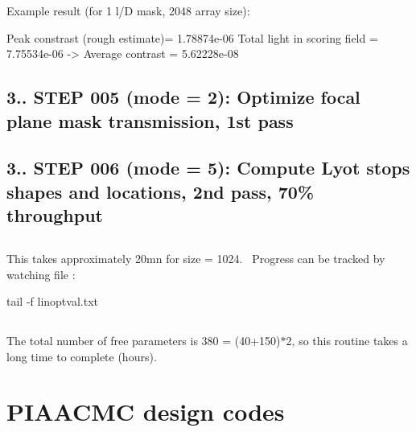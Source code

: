Example result (for 1 l/\+D mask, 2048 array size)\+: \begin{DoxyVerb}Peak constrast (rough estimate)= 1.78874e-06
Total light in scoring field = 7.75534e-06  -> Average contrast = 5.62228e-08
\end{DoxyVerb}
\hypertarget{md_src_PIAACMCsimul_README_step005}{}\subsection{3.. S\+T\+E\+P 005 (mode = 2)\+: Optimize focal plane mask transmission, 1st pass}\label{md_src_PIAACMCsimul_README_step005}
\hypertarget{md_src_PIAACMCsimul_README_step006}{}\subsection{3.. S\+T\+E\+P 006 (mode = 5)\+: Compute Lyot stops shapes and locations, 2nd pass, 70\% throughput}\label{md_src_PIAACMCsimul_README_step006}
\hypertarget{_}{}\subsection{}\label{_}
This takes approximately 20mn for size = 1024.~\newline
Progress can be tracked by watching file \+: \begin{DoxyVerb}tail -f linoptval.txt
\end{DoxyVerb}
\hypertarget{_}{}\subsection{}\label{_}
\hypertarget{_}{}\subsection{}\label{_}
\hypertarget{_}{}\subsection{}\label{_}
\hypertarget{_}{}\subsection{}\label{_}
\hypertarget{_}{}\subsection{}\label{_}
The total number of free parameters is 380 = (40+150)$\ast$2, so this routine takes a long time to complete (hours).\hypertarget{_}{}\subsection{}\label{_}
\hypertarget{PIAACMC_designcodes}{}\section{P\+I\+A\+A\+C\+M\+C design codes}\label{PIAACMC_designcodes}
